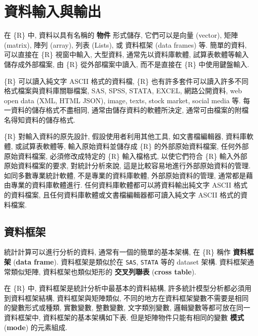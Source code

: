\documentclass[
]{book}
\begin{document}
\hypertarget{ux8cc7ux6599ux8f38ux5165ux8207ux8f38ux51fa}{%
\chapter{資料輸入與輸出}\label{ux8cc7ux6599ux8f38ux5165ux8207ux8f38ux51fa}}

在 \{R\} 中, 資料以具有名稱的
\textbf{物件}
形式儲存,
它們可以是向量 (vector), 矩陣 (matrix), 陣列 (array), 列表 (Lists),
或 資料框架 (data frames) 等.
簡單的資料, 可以直接在 \{R\} 視窗中輸入,
大型資料, 通常先以資料庫軟體,
試算表軟體等輸入儲存成外部檔案,
由 \{R\} 從外部檔案中讀入,
而不是直接在 \{R\} 中使用鍵盤輸入.

\{R\} 可以讀入純文字 ASCII 格式的資料檔,
\{R\} 也有許多套件可以讀入許多不同格式檔案與資料庫關聯檔案,
SAS, SPSS, STATA, EXCEL,
網路公開資料,
web open data (XML, HTML JSON),
image, texts, stock market, social media 等.
每一資料的儲存格式不盡相同,
通常由儲存資料的軟體所決定,
通常可由檔案的附檔名得知資料的儲存格式.

\{R\} 對輸入資料的原先設計,
假設使用者利用其他工具,
如文書檔編輯器, 資料庫軟體, 或試算表軟體等,
輸入原始資料並儲存成 \{R\} 的外部原始資料檔案,
任何外部原始資料檔案,
必須修改成特定的 \{R\} 輸入檔格式,
以使它們符合 \{R\} 輸入外部原始資料檔案的要求,
對統計分析來說,
這是比較容易地進行外部原始資料的管理.
如同多數專業統計軟體, 不是專業的資料庫軟體,
外部原始資料的管理, 通常都是藉由專業的資料庫軟體進行.
任何資料庫軟體都可以將資料輸出純文字 ASCII 格式的資料檔案,
且任何資料庫軟體或文書檔編輯器都可讀入純文字 ASCII 格式的資料檔案.

\hypertarget{ux8cc7ux6599ux6846ux67b6}{%
\section{資料框架}\label{ux8cc7ux6599ux6846ux67b6}}

統計計算可以進行分析的資料,
通常有一個的簡單的基本架構,
在 \{R\} 稱作
\textbf{資料框架}
(\textbf{data frame}).
資料框架是類似於在 \texttt{SAS}, \texttt{STATA} 等的 dataset 架構.
資料框架通常類似矩陣,
資料框架也類似矩形的
\textbf{交叉列聯表}
(\textbf{cross table}).

在 \{R\} 中, 資料框架是統計分析中最基本的資料結構,
許多統計模型分析都必須用到資料框架結構,
資料框架與矩陣類似,
不同的地方在資料框架變數不需要是相同的變數形式或種類,
實數變數, 整數變數, 文字類別變數, 邏輯變數等都可放在同一資料框架中,
資料框架的基本架構如下表.
但是矩陣物件只能有相同的變數 \textbf{模式} (\textbf{mode}) 的元素組成.
\end{document}
